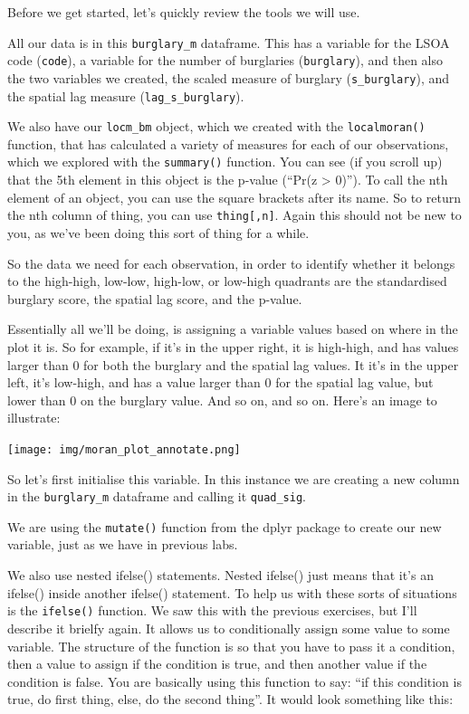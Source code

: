 \documentclass[]{book}
\begin{document}
Before we get started, let's quickly review the tools we will use.

All our data is in this \texttt{burglary\_m} dataframe. This has a variable for the LSOA code (\texttt{code}), a variable for the number of burglaries (\texttt{burglary}), and then also the two variables we created, the scaled measure of burglary (\texttt{s\_burglary}), and the spatial lag measure (\texttt{lag\_s\_burglary}).

We also have our \texttt{locm\_bm} object, which we created with the \texttt{localmoran()} function, that has calculated a variety of measures for each of our observations, which we explored with the \texttt{summary()} function. You can see (if you scroll up) that the 5th element in this object is the p-value (``Pr(z \textgreater{} 0)''). To call the nth element of an object, you can use the square brackets after its name. So to return the nth column of thing, you can use \texttt{thing{[},n{]}}. Again this should not be new to you, as we've been doing this sort of thing for a while.

So the data we need for each observation, in order to identify whether it belongs to the high-high, low-low, high-low, or low-high quadrants are the standardised burglary score, the spatial lag score, and the p-value.

Essentially all we'll be doing, is assigning a variable values based on where in the plot it is. So for example, if it's in the upper right, it is high-high, and has values larger than 0 for both the burglary and the spatial lag values. It it's in the upper left, it's low-high, and has a value larger than 0 for the spatial lag value, but lower than 0 on the burglary value. And so on, and so on. Here's an image to illustrate:

\texttt{[image: img/moran\_plot\_annotate.png]}

So let's first initialise this variable. In this instance we are creating a new column in the \texttt{burglary\_m} dataframe and calling it \texttt{quad\_sig}.

We are using the \texttt{mutate()} function from the dplyr package to create our new variable, just as we have in previous labs.

We also use nested ifelse() statements. Nested ifelse() just means that it's an ifelse() inside another ifelse() statement. To help us with these sorts of situations is the \texttt{ifelse()} function. We saw this with the previous exercises, but I'll describe it brielfy again. It allows us to conditionally assign some value to some variable. The structure of the function is so that you have to pass it a condition, then a value to assign if the condition is true, and then another value if the condition is false. You are basically using this function to say: ``if this condition is true, do first thing, else, do the second thing''. It would look something like this:
\end{document}
